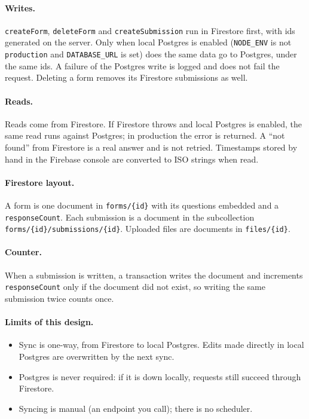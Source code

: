 \documentclass[11pt,a4paper]{article}
\begin{document}
\paragraph{Writes.} \texttt{createForm}, \texttt{deleteForm} and \texttt{createSubmission} run in Firestore first, with ids generated on the server. Only when local Postgres is enabled (\texttt{NODE\_ENV} is not \texttt{production} and \texttt{DATABASE\_URL} is set) does the same data go to Postgres, under the same ids. A failure of the Postgres write is logged and does not fail the request. Deleting a form removes its Firestore submissions as well.

\paragraph{Reads.} Reads come from Firestore. If Firestore throws and local Postgres is enabled, the same read runs against Postgres; in production the error is returned. A ``not found'' from Firestore is a real answer and is not retried. Timestamps stored by hand in the Firebase console are converted to ISO strings when read.

\paragraph{Firestore layout.} A form is one document in \texttt{forms/\{id\}} with its questions embedded and a \texttt{responseCount}. Each submission is a document in the subcollection \texttt{forms/\{id\}/submissions/\{id\}}. Uploaded files are documents in \texttt{files/\{id\}}.

\paragraph{Counter.} When a submission is written, a transaction writes the document and increments \texttt{responseCount} only if the document did not exist, so writing the same submission twice counts once.

\paragraph{Limits of this design.}
\begin{itemize}
  \item Sync is one-way, from Firestore to local Postgres. Edits made directly in local Postgres are overwritten by the next sync.
  \item Postgres is never required: if it is down locally, requests still succeed through Firestore.
  \item Syncing is manual (an endpoint you call); there is no scheduler.
\end{itemize}
\end{document}
